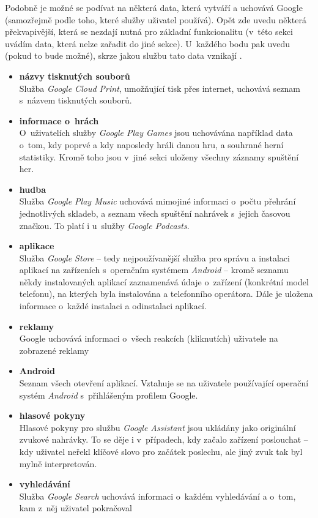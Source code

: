 Podobně je možné se podívat na některá data, která vytváří a uchovává Google (samozřejmě podle toho, které služby uživatel používá). Opět zde uvedu některá překvapivější, která se nezdají nutná pro základní funkcionalitu (v~této sekci uvádím data, která nelze zařadit do jiné sekce).
U~každého bodu pak uvedu (pokud to bude možné), skrze jakou službu tato data vznikají .

\begin{itemize}
	\item \textbf{názvy tisknutých souborů}\\
	Služba \textit{Google Cloud Print}, umožňující tisk přes internet, uchovává seznam s~názvem tisknutých souborů.

	\item \textbf{informace o~hrách}\\
	O~uživatelích služby \textit{Google Play Games} jsou uchovávána například data o~tom, kdy poprvé a kdy naposledy hráli danou hru, a souhrnné herní statistiky. Kromě toho jsou v~jiné sekci uloženy všechny záznamy spuštění her. 

	\item \textbf{hudba}\\
	Služba \textit{Google Play Music} uchovává mimojiné informaci o~počtu přehrání jednotlivých skladeb, a seznam všech spuštění nahrávek s~jejich časovou značkou. To platí i u~služby \textit{Google Podcasts}.

	\item \textbf{aplikace}\\
	Služba \textit{Google Store} -- tedy nejpoužívanější služba pro správu a instalaci aplikací na zařízeních s~operačním systémem \textit{Android} -- kromě seznamu někdy instalovaných aplikací zaznamenává údaje o~zařízení (konkrétní model telefonu), na kterých byla instalována a telefonního operátora. Dále je uložena informace o~každé instalaci a odinstalaci aplikací.
	
	\item \textbf{reklamy}\\
	Google uchovává informaci o~všech reakcích (kliknutích) uživatele na zobrazené reklamy

	\item \textbf{Android}\\
	Seznam všech otevření aplikací. Vztahuje se na uživatele používající operační systém \textit{Android} s~přihlášeným profilem Google. 

	\item \textbf{hlasové pokyny}\\
	Hlasové pokyny pro službu \textit{Google Assistant} jsou ukládány jako originální zvukové nahrávky. To se děje i v~případech, kdy začalo zařízení poslouchat  -- kdy uživatel neřekl klíčové slovo pro začátek poslechu, ale jiný zvuk tak byl mylně interpretován. 

	\item \textbf{vyhledávání}\\
	Služba \textit{Google Search} uchovává informaci o~každém vyhledávání a o~tom, kam z~něj uživatel pokračoval
\end{itemize}

